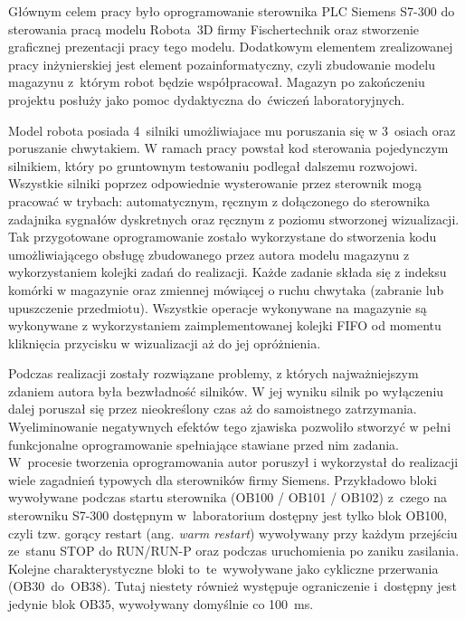\documentclass[a4paper,12pt]{article}
\begin{document}
\lstset{numbers=left, stepnumber=1, numbersep=10pt, frame=single}
\lstset{frameround=tttt}
\renewcommand{\lstlistlistingname}{\vspace*{-13mm}}
\renewcommand{\listfigurename}{\vspace*{-13mm}}
\renewcommand{\listtablename}{\vspace*{-13mm}}
\renewcommand*{\refname}{\vspace*{-13mm}}
\renewcommand{\lstlistingname}{Kod źródłowy} 

Głównym celem pracy było oprogramowanie sterownika PLC Siemens S7-300 do sterowania pracą modelu Robota~3D firmy Fischertechnik oraz stworzenie graficznej prezentacji pracy tego modelu. Dodatkowym elementem zrealizowanej pracy inżynierskiej jest element pozainformatyczny, czyli zbudowanie modelu magazynu z~którym robot będzie współpracował. Magazyn po zakończeniu projektu posłuży jako pomoc dydaktyczna do~ćwiczeń laboratoryjnych.

Model robota posiada 4~silniki umożliwiajace mu poruszania się w 3~osiach oraz poruszanie chwytakiem. W ramach pracy powstał kod sterowania pojedynczym silnikiem, który po gruntownym testowaniu podlegał dalszemu rozwojowi. Wszystkie silniki poprzez odpowiednie wysterowanie przez sterownik mogą pracować w trybach: automatycznym, ręcznym z dołączonego do sterownika zadajnika sygnałów dyskretnych oraz ręcznym z poziomu stworzonej wizualizacji. Tak przygotowane oprogramowanie zostało wykorzystane do stworzenia kodu umożliwiającego obsługę zbudowanego przez autora modelu magazynu z wykorzystaniem kolejki zadań do realizacji. Każde zadanie składa się z indeksu komórki w magazynie oraz zmiennej mówiącej o ruchu chwytaka (zabranie lub upuszczenie przedmiotu). Wszystkie operacje wykonywane na magazynie są wykonywane z wykorzystaniem zaimplementowanej kolejki FIFO od momentu kliknięcia przycisku w wizualizacji aż do jej opróżnienia.

Podczas realizacji zostały rozwiązane problemy, z których najważniejszym zdaniem autora była bezwładność silników. W jej wyniku silnik po wyłączeniu dalej poruszał się przez nieokreślony czas aż do samoistnego zatrzymania. Wyeliminowanie negatywnych efektów tego zjawiska pozwoliło stworzyć w pełni funkcjonalne oprogramowanie spełniające stawiane przed nim zadania.
W~procesie tworzenia oprogramowania autor poruszył i wykorzystał do realizacji wiele zagadnień typowych dla sterowników firmy Siemens. Przykładowo bloki wywoływane podczas startu sterownika (OB100 / OB101 / OB102) z~czego na sterowniku S7-300 dostępnym w~laboratorium dostępny jest tylko blok OB100, czyli tzw. gorący restart (ang. \emph{warm restart}) wywoływany przy każdym przejściu ze~stanu STOP do RUN/RUN-P oraz podczas uruchomienia po zaniku zasilania. Kolejne charakterystyczne bloki to~te~wywoływane jako cykliczne przerwania (OB30~do~OB38). Tutaj niestety również występuje ograniczenie i~dostępny jest jedynie blok OB35, wywoływany domyślnie co 100~ms.
\end{document}
